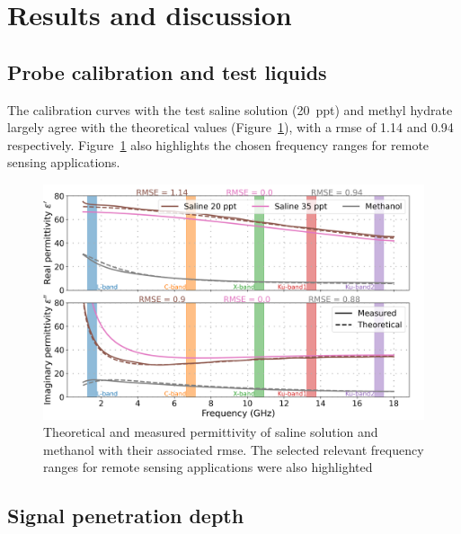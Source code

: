\section{Results and discussion}

\subsection{Probe calibration and test liquids}\label{subsec:res-calib}
The calibration curves with the test saline solution (\qty{20}{ppt}) and methyl hydrate largely agree with the theoretical values \parencite{Nyshadham1992} (Figure~\ref{fig:calib-results}), with a \ac{rmse} of \num{1.14} and \num{0.94} respectively.
Figure~\ref{fig:calib-results} also highlights the chosen frequency ranges for remote sensing applications.

\begin{figure}[ht!]
    \centering
    \includegraphics[width=\columnwidth]{Images/calibration-results.png}
    \caption[]{Theoretical and measured permittivity of saline solution and methanol with their associated \ac{rmse}. The selected relevant frequency ranges for remote sensing applications were also highlighted}\label{fig:calib-results}
\end{figure}

\subsection{Signal penetration depth}

